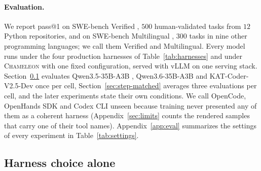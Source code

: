 \documentclass{article} %
\newcommand{\cham}{\textsc{Chameleon}}
\newcommand{\basemodel}{Qwen3.6-35B-A3B}
\newcommand{\swev}{SWE-bench Verified}
\newcommand{\swem}{SWE-bench Multilingual}
\newcommand{\opencode}{OpenCode}
\newcommand{\codexcli}{Codex CLI}
\newcommand{\openhands}{OpenHands SDK}   %
\begin{document}
\paragraph{Evaluation.} We report pass@1 on \swev{}
\citep{jimenez2024swebench}, $500$ human-validated tasks from $12$ Python
repositories, and on \swem{} \citep{yang2025swesmith}, $300$ tasks in nine
other programming languages; we call them Verified and Multilingual. Every
model runs under the four production harnesses of Table~\ref{tab:harnesses}
and under \cham{} with one fixed configuration, served with vLLM
\citep{kwon2023vllm} on one serving stack. Section~\ref{sec:harness-choice}
evaluates Qwen3.5-35B-A3B \citep{qwen35card}, \basemodel{} and
KAT-Coder-V2.5-Dev \citep{huang2026katcoder} once per cell,
Section~\ref{sec:step-matched} averages three evaluations per cell, and the
later experiments state their own conditions. We call \opencode{},
\openhands{} and \codexcli{} unseen because training never presented any of
them as a coherent harness (Appendix~\ref{sec:limits} counts the rendered
samples that carry one of their tool names). Appendix~\ref{app:eval} summarizes the settings of every experiment in
Table~\ref{tab:settings}.

\subsection{Harness choice alone}
\label{sec:harness-choice}
\end{document}
